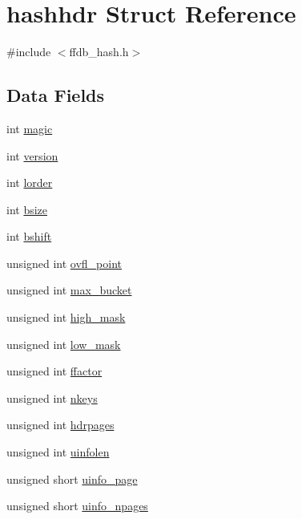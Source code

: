 \hypertarget{structhashhdr}{}\section{hashhdr Struct Reference}
\label{structhashhdr}


{\ttfamily \#include $<$ffdb\+\_\+hash.\+h$>$}

\subsection*{Data Fields}
\begin{DoxyCompactItemize}
\item 
int \mbox{\hyperlink{structhashhdr_a2ca885643170199881fb8d5e6f35fb0b}{magic}}
\item 
int \mbox{\hyperlink{structhashhdr_a482cd2214ac811ec00b887e2de4280b0}{version}}
\item 
int \mbox{\hyperlink{structhashhdr_a4c62299ebefbc6685770b2c48e85e5f7}{lorder}}
\item 
int \mbox{\hyperlink{structhashhdr_a9333f0a36d1fa1d01361d575cfe4649c}{bsize}}
\item 
int \mbox{\hyperlink{structhashhdr_a0f659452a041702880751164a032c46b}{bshift}}
\item 
unsigned int \mbox{\hyperlink{structhashhdr_a1b4cf832efb19ea5c55f8f8e471e5272}{ovfl\+\_\+point}}
\item 
unsigned int \mbox{\hyperlink{structhashhdr_a79695a98ccb73de377d976d9f3f52d0c}{max\+\_\+bucket}}
\item 
unsigned int \mbox{\hyperlink{structhashhdr_a0af934c1fbbd9d4e806a7dfd60eeaee6}{high\+\_\+mask}}
\item 
unsigned int \mbox{\hyperlink{structhashhdr_ac5392d3b95753b0c1699305e7a8e88e6}{low\+\_\+mask}}
\item 
unsigned int \mbox{\hyperlink{structhashhdr_aed6d4b048783a296c13bf2a19f4e3203}{ffactor}}
\item 
unsigned int \mbox{\hyperlink{structhashhdr_ae9db5f797f4a5af68b83f5de36be72f8}{nkeys}}
\item 
unsigned int \mbox{\hyperlink{structhashhdr_ac406338d778bc3cf51b86577076b0f54}{hdrpages}}
\item 
unsigned int \mbox{\hyperlink{structhashhdr_a5630409e6445f62540f56b8bed738de0}{uinfolen}}
\item 
unsigned short \mbox{\hyperlink{structhashhdr_a2452d681b10038f094100ce60736042a}{uinfo\+\_\+page}}
\item 
unsigned short \mbox{\hyperlink{structhashhdr_a84793402614fcbe42a855b11e00c9314}{uinfo\+\_\+npages}}

\end{DoxyCompactItemize}
